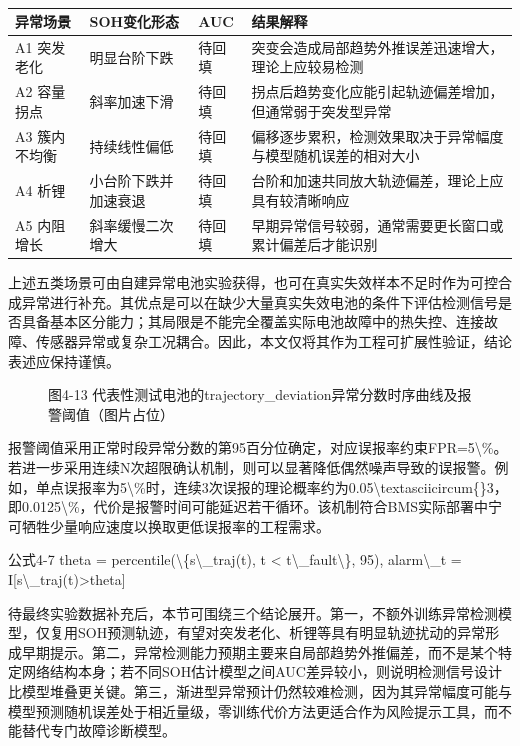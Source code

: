 \documentclass[12pt, a4paper]{ctexart}
\begin{document}
\begin{table}[H]
  \centering
  \begin{tabular}{llll}
  \toprule
  异常场景 & SOH变化形态 & AUC & 结果解释 \\
  \midrule
  A1 突发老化 & 明显台阶下跌 & 待回填 & 突变会造成局部趋势外推误差迅速增大，理论上应较易检测 \\
  A2 容量拐点 & 斜率加速下滑 & 待回填 & 拐点后趋势变化应能引起轨迹偏差增加，但通常弱于突发型异常 \\
  A3 簇内不均衡 & 持续线性偏低 & 待回填 & 偏移逐步累积，检测效果取决于异常幅度与模型随机误差的相对大小 \\
  A4 析锂 & 小台阶下跌并加速衰退 & 待回填 & 台阶和加速共同放大轨迹偏差，理论上应具有较清晰响应 \\
  A5 内阻增长 & 斜率缓慢二次增大 & 待回填 & 早期异常信号较弱，通常需要更长窗口或累计偏差后才能识别 \\
  \bottomrule
  \end{tabular}
  \caption{}
  \label{tab:}
\end{table}

上述五类场景可由自建异常电池实验获得，也可在真实失效样本不足时作为可控合成异常进行补充。其优点是可以在缺少大量真实失效电池的条件下评估检测信号是否具备基本区分能力；其局限是不能完全覆盖实际电池故障中的热失控、连接故障、传感器异常或复杂工况耦合。因此，本文仅将其作为工程可扩展性验证，结论表述应保持谨慎。



\begin{figure}[H]
  \centering
  \caption{图4-13  代表性测试电池的trajectory\_deviation异常分数时序曲线及报警阈值（图片占位）}
  \label{fig:}
\end{figure}

报警阈值采用正常时段异常分数的第95百分位确定，对应误报率约束FPR=5\textbackslash{}\%。若进一步采用连续N次超限确认机制，则可以显著降低偶然噪声导致的误报警。例如，单点误报率为5\textbackslash{}\%时，连续3次误报的理论概率约为0.05\textbackslash{}textasciicircum\{\}3，即0.0125\textbackslash{}\%，代价是报警时间可能延迟若干循环。该机制符合BMS实际部署中宁可牺牲少量响应速度以换取更低误报率的工程需求。


公式4-7  theta = percentile(\textbackslash{}\{s\textbackslash{}\_traj(t), t < t\textbackslash{}\_fault\textbackslash{}\}, 95),  alarm\textbackslash{}\_t = I[s\textbackslash{}\_traj(t)>theta]


待最终实验数据补充后，本节可围绕三个结论展开。第一，不额外训练异常检测模型，仅复用SOH预测轨迹，有望对突发老化、析锂等具有明显轨迹扰动的异常形成早期提示。第二，异常检测能力预期主要来自局部趋势外推偏差，而不是某个特定网络结构本身；若不同SOH估计模型之间AUC差异较小，则说明检测信号设计比模型堆叠更关键。第三，渐进型异常预计仍然较难检测，因为其异常幅度可能与模型预测随机误差处于相近量级，零训练代价方法更适合作为风险提示工具，而不能替代专门故障诊断模型。
\end{document}
